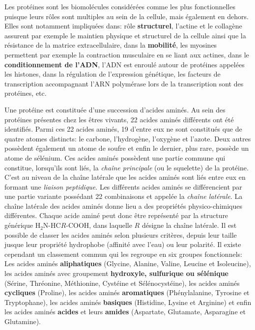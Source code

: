 Les protéines sont les biomolécules considérées comme les plus fonctionnelles puisque leurs rôles sont multiples au sein de la cellule, mais également en dehors. Elles sont notamment impliquées dans: rôle \textbf{structurel}, l'actine et le collagène assurent par exemple le maintien physique et structurel de la cellule ainsi que la résistance de la matrice extracellulaire, dans la \textbf{mobilité}, les myosines permettent par exemple la contraction musculaire en se liant aux actines, dans le \textbf{conditionnement de l'ADN}, l'ADN est enroulé autour de protéines appelées les histones, dans la régulation de l'expression génétique, les facteurs de transcription accompagnant l'ARN polymérase lors de la transcription sont des protéines, etc.

Une protéine est constituée d'une succession d'acides aminés. Au sein des protéines présentes chez les êtres vivants, 22 acides aminés différents ont été identifiés. Parmi ces 22 acides aminés, 19 d'entre eux ne sont constitués que de quatre atomes distincts: le carbone, l'hydrogène, l'oxygène et l'azote. Deux autres possèdent également un atome de soufre et enfin le dernier, plus rare, possède un atome de sélénium. Ces acides aminés possèdent une partie commune qui constitue, lorsqu'ils sont liés, la \textit{chaîne principale} (ou le squelette) de la protéine. C'est au niveau de la chaîne latérale que les acides aminés sont liés entre eux en formant une \textit{liaison peptidique}. Les différents acides aminés se différencient par une partie variante possédant 22 combinaisons et appelée la \textit{chaîne latérale}. La chaîne latérale des acides aminés donne lieu a des propriétés physico-chimiques différentes. Chaque acide aminé peut donc être représenté par la structure générique H$_{2}$N-HC$R$-COOH, dans laquelle $R$ désigne la chaîne latérale. 
Il est possible de classer les acides aminés selon plusieurs critères, depuis leur taille jusque leur propriété hydrophobe (affinité avec l'eau) ou leur polarité. Il existe cependant un classement commun qui les regroupe en six groupes fonctionnels: Les acides aminés \textbf{aliphatiques} (Glycine, Alanine, Valine, Leucine et Isoleucine), les acides aminés avec groupement \textbf{hydroxyle, sulfurique ou sélénique} (Sérine, Thréonine, Méthionine, Cystéine et Sélénocystéine), les acides aminés \textbf{cycliques} (Proline), les acides aminés \textbf{aromatiques} (Phénylalanine, Tyrosine et Tryptophane), les acides aminés \textbf{basiques} (Histidine, Lysine et Arginine) et enfin les acides aminés \textbf{acides} et leurs \textbf{amides} (Aspartate, Glutamate, Asparagine et Glutamine).

